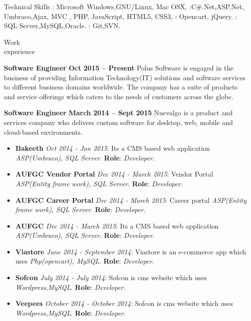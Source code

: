 \documentclass{resume}
\author{Babin Babu}
\begin{document}
\maketitle


\begin{category}{Technical Skills}
  :  Microsoft Windows,GNU/Linux, Mac OSX.
  :C#.Net,ASP.Net, Umbraco,Ajax, MVC , PHP, JavaScript, HTML5, CSS3,
  : Opencart, jQuery.
  : SQL Server,MySQL,Oracle.
  : Git,SVN.
\end{category}


\begin{category}{Work \\experience}

  \citemnobullet \textbf{Software Engineer} \hfill \textbf{Oct 2015 -- Present }
  \citemnobullet Polus Software is engaged in the business of  providing Information Technology(IT) solutions and software services to different business domains worldwide. The company has a suite of products and service offerings which caters to the needs of customers across the globe. 

  \citemnobullet \textbf{Software Engineer} \hfill \textbf{March 2014 -- Sept 2015}
  \citemnobullet Nuevalgo is a product and services company who delivers custom software for desktop, web, mobile and cloud-based environments.
  \begin{itemize}
  \item \textbf{Bakeeth} {\em Oct 2014 - Jan 2015}: Its a CMS based web application {\em ASP(Umbraco),  SQL Server}. \textbf{Role}: {\em Developer}.  
  \item \textbf{AUFGC Vendor Portal} {\em Dec 2014 - March 2015}: Vendor Portal {\em ASP(Entity frame work),  SQL Server}. \textbf{Role}: {\em Developer}.  
  \item \textbf{AUFGC Career Portal} {\em Dec 2014 - March 2015}: Career portal {\em ASP(Entity frame work),  SQL Server}. \textbf{Role}: {\em Developer}.  
  \item \textbf{AUFGC} {\em Dec 2014 - March 2015}: Its a CMS based web application {\em ASP(Umbraco),  SQL Server}. \textbf{Role}: {\em Developer}.  
  \item \textbf{Viastore} {\em June 2014 - September 2014}: Viastore is an e-commerce app which uses {\em Php(opencart),  MySQL}. \textbf{Role}: {\em Developer}.  
  \item \textbf{Sofcon} {\em July 2014 - July 2014}: Sofcon is cms website which uses {\em Wordpress,MySQL}. \textbf{Role}: {\em Developer}.
  \item \textbf{Veepees} {\em October 2014 - October 2014}: Sofcon is cms website which uses {\em Wordpress,MySQL}. \textbf{Role}: {\em Developer}.
  \end{itemize}
  \end{category}
\end{document}
